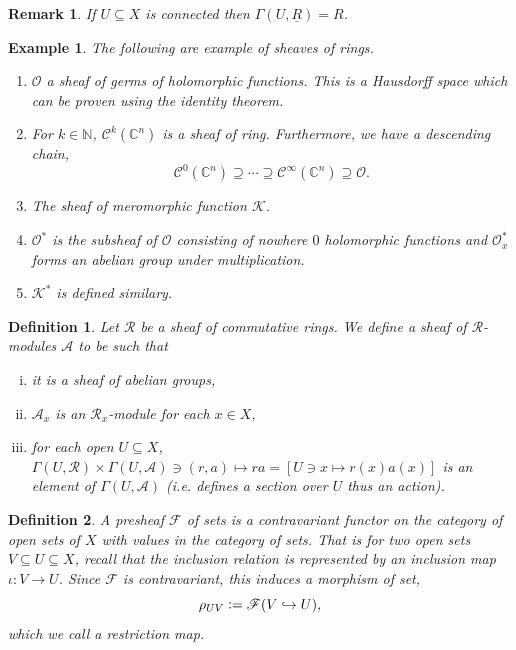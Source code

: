 \documentclass{article}
\newtheorem{definition}{Definition}[section]
\newtheorem{remark}{Remark}[section]
\newtheorem{example}{Example}[section]
\newcommand{\defeq}{\vcentcolon=}
\newcommand{\N}[0]{\mathbb{N}}
\newcommand{\C}[0]{\mathbb{C}}
\newcommand{\Ouv}[0]{\mathcal{O}}
\newcommand{\ck}[1]{\mathcal{C}^{#1}}
\newcommand{\cinf}[0]{\ck{\infty}}
\begin{document}
\begin{remark}
  If $U\subseteq X$ is connected then $\Gamma(U,\underline{R})=R$.
\end{remark}

\begin{example}The following are example of sheaves of rings.
  \begin{enumerate}[1).]
    \item $\Ouv$ a sheaf of germs of holomorphic functions. This is a Hausdorff space which can be proven using the identity theorem.
    \item For $k\in\N$, $\ck{k}(\C^n)$ is a sheaf of ring. Furthermore, we have a descending chain,
    \begin{equation*}
      \ck{0}(\C^n)\supseteq \cdots \supseteq \cinf(\C^n)\supseteq \Ouv.
    \end{equation*}
    \item The sheaf of meromorphic function $\mathcal{K}$.
    \item $\Ouv^*$ is the subsheaf of $\Ouv$ consisting of nowhere $0$ holomorphic functions and $\Ouv^*_x$ forms an abelian group under multiplication.
    \item $\mathcal{K}^*$ is defined similary.
  \end{enumerate}

\end{example}

  \begin{definition}
    Let $\mathcal{R}$ be a sheaf of commutative rings. We define a sheaf of $\mathcal{R}$-modules $\mathcal{A}$ to be such that 
    \begin{enumerate}[i).]
      \item it is a sheaf of abelian groups,
      \item $\mathcal{A}_x$ is an $\mathcal{R}_x$-module for each $x\in X$,
      \item for each open $U\subseteq X$, $\Gamma(U,\mathcal{R})\times \Gamma(U,\mathcal{A})\ni(r,a)\mapsto ra = [U\ni x\mapsto r(x)a(x)]$ is an element of $\Gamma(U,\mathcal{A})$ (i.e. defines a section over $U$ thus an action).
    \end{enumerate}
  \end{definition}

  \begin{definition}
    A presheaf $\mathscr{F}$ of sets is a contravariant functor on the category of open sets of $X$ with values in the category of sets. That is for two open sets $V\subseteq U\subseteq X$, recall that the inclusion relation is represented by an inclusion map $\iota:V\to U$. Since $\mathscr{F}$ is contravariant, this induces a morphism of set,
    \begin{equation*}
      \rho_{UV} \defeq \mathscr{F}(V\hookrightarrow U),
    \end{equation*}
    which we call a restriction map.
  \end{definition}
\end{document}

